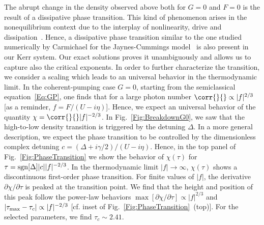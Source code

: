 The abrupt change in the density observed above both for $G=0$ and $F=0$ is the result of a dissipative phase transition.
This kind of phenomenon arises in the nonequilibrium context due to the interplay of nonlinearity, drive and dissipation~\cite{AlsingQO91,KilinJOSAB91,CarmichaelPRX15}.
Hence, a dissipative phase transition similar to the one studied numerically by Carmichael for the Jaynes-Cummings model~\cite{CarmichaelPRX15} is also present in our Kerr system.
Our exact solutions proves it unambiguously and allows us to capture also the critical exponents.
In order to further characterize the transition, we consider a scaling which leads to an universal behavior in the thermodynamic limit.
In the coherent-pumping case $G=0$, starting from the semiclassical equation~\eqref{Eq:GP}, one finds that for a large photon number $\corr{}{}\propto|f|^{2/3}$ [as a reminder, $f=F/(U-i\eta)$].
Hence, we expect an universal behavior of the quantity $\chi=\corr{}{}|f|^{-2/3}$.
In Fig.~\ref{Fig:BreakdownG0}, we saw that the high-to-low density transition is triggered by the detuning $\Delta$.
In a more general description, we expect the phase transition to be controlled by the dimensionless complex detuning $c=(\Delta+i\gamma/2)/(U-i\eta)$.
Hence, in the top panel of Fig.~\ref{Fig:PhaseTransition} we show the behavior of $\chi(\tau)$ for $\tau={\rm sgn}[\Delta]|c||f|^{-2/3}$.
In the thermodynamic limit $|f|\to\infty$, $\chi(\tau)$ shows a discontinuous first-order phase transition.
For finite values of $|f|$, the derivative $\partial\chi/\partial\tau$ is peaked at the transition point.
We find that the height and position of this peak follow the power-law behaviors $\max[\partial\chi/\partial\tau]\propto|f|^{2/3}$ and $|\tau_{\rm max}-\tau_c|\propto|f|^{-2/3}$ [cf. inset of Fig.~\ref{Fig:PhaseTransition}~(top)].
For the selected parameters, we find $\tau_c\sim2.41$.

